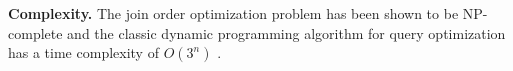 \textbf{Complexity.} The join order optimization problem has been
shown to be NP-complete \cite{vance_rapid_1996} and the classic
dynamic programming algorithm for query optimization has a time
complexity of $O(3^n)$ \cite{kossmann_iterative_2000}.












